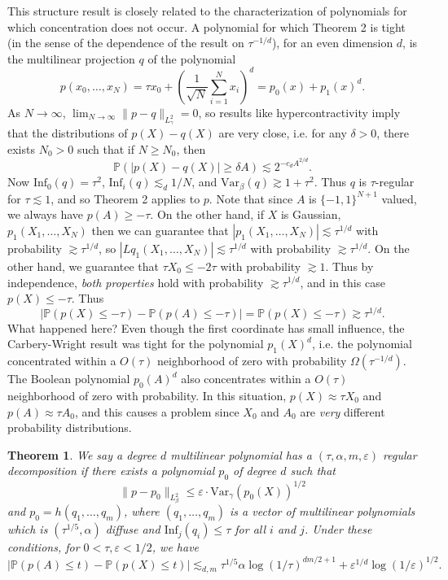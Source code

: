 \documentclass{article}
\theoremstyle{plain}
\newtheorem{theorem}{Theorem}
\theoremstyle{definition}
\begin{document}
This structure result is closely related to the characterization of polynomials for which concentration does not occur. A polynomial for which Theorem 2 is tight (in the sense of the dependence of the result on $\tau^{-1/d}$), for an even dimension $d$, is the multilinear projection $q$ of the polynomial
%
\[ p(x_0,\dots,x_N) = \tau x_0 + \left( \frac{1}{\sqrt{N}} \sum_{i=1}^N x_i \right)^d = p_0(x) + p_1(x)^d. \]
%
As $N \to \infty$, $\lim_{N \to \infty} \| p - q \|_{L^2_\gamma} = 0$, so results like hypercontractivity imply that the distributions of $p(X) - q(X)$ are very close, i.e. for any $\delta > 0$, there exists $N_0 > 0$ such that if $N \geq N_0$, then
%
\[ \mathbb{P}(|p(X) - q(X)| \geq \delta A) \lesssim 2^{- c_d A^{2/d}}. \]
%
Now $\text{Inf}_0(q) = \tau^2$, $\text{Inf}_i(q) \lesssim_d 1/N$, and $\text{Var}_\beta(q) \gtrsim 1 + \tau^2$. Thus $q$ is $\tau$-regular for $\tau \lesssim 1$, and so Theorem 2 applies to $p$. Note that since $A$ is $\{ -1, 1 \}^{N+1}$ valued, we always have $p(A) \geq -\tau$. On the other hand, if $X$ is Gaussian, $p_1(X_1,\dots,X_N)$ then we can guarantee that $|p_1(X_1,\dots,X_N)| \lesssim \tau^{1/d}$ with probability $\gtrsim \tau^{1/d}$, so $|Lq_1(X_1,\dots,X_N)| \lesssim \tau^{1/d}$ with probability $\gtrsim \tau^{1/d}$. On the other hand, we guarantee that $\tau X_0 \leq -2 \tau$ with probability $\gtrsim 1$. Thus by independence, \emph{both properties} hold with probability $\gtrsim \tau^{1/d}$, and in this case $p(X) \leq - \tau$. Thus
%
\[ |\mathbb{P}(p(X) \leq - \tau) - \mathbb{P}(p(A) \leq -\tau)| = \mathbb{P}(p(X) \leq -\tau) \gtrsim \tau^{1/d}. \]
What happened here? Even though the first coordinate has small influence, the Carbery-Wright result was tight for the polynomial $p_1(X)^d$, i.e. the polynomial concentrated within a $O(\tau)$ neighborhood of zero with probability $\Omega(\tau^{-1/d})$. The Boolean polynomial $p_0(A)^d$ also concentrates within a $O(\tau)$ neighborhood of zero with probability. In this situation, $p(X) \approx \tau X_0$ and $p(A) \approx \tau A_0$, and this causes a problem since $X_0$ and $A_0$ are \emph{very} different probability distributions.

\begin{theorem}
    We say a degree $d$ multilinear polynomial has a $(\tau, \alpha, m, \varepsilon)$ regular decomposition if there exists a polynomial $p_0$ of degree $d$ such that
    \[  \| p - p_0 \|_{L^2_\beta} \leq \varepsilon \cdot \text{Var}_\gamma(p_0(X))^{1/2} \]
    and $p_0 = h(q_1,\dots,q_m)$, where $(q_1,\dots,q_m)$ is a vector of multilinear polynomials which is $(\tau^{1/5}, \alpha)$ diffuse and $\text{Inf}_j(q_i) \leq \tau$ for all $i$ and $j$. Under these conditions, for $0 < \tau, \varepsilon < 1/2$, we have
    \[ |\mathbb{P}(p(A) \leq t) - \mathbb{P}(p(X) \leq t)| \lesssim_{d,m} \tau^{1/5} \alpha \log(1/\tau)^{dm / 2 + 1} + \varepsilon^{1/d} \log(1/\varepsilon)^{1/2}. \]
\end{theorem}
\end{document}
